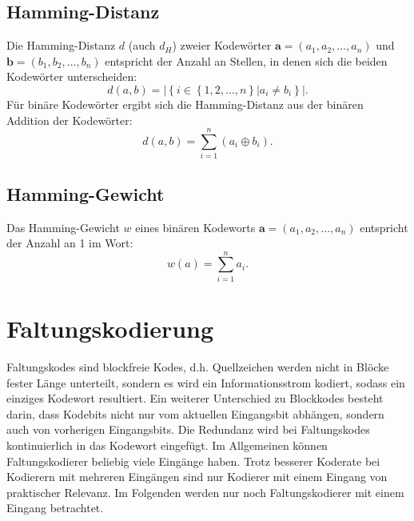 \subsection{Hamming-Distanz}
\label{kapitel:grundlagen_hamming_distanz}
Die Hamming-Distanz $d$ (auch $d_{H}$) zweier Kodewörter $\mathbf{a}=\left( a_{1},a_{2},\dots ,a_{n}\right)$ und $\mathbf{b}=\left( b_{1},b_{2},\dots ,b_{n}\right)$ entspricht der Anzahl an Stellen, in denen sich die beiden Kodewörter unterscheiden:
\begin{equation}
d(a,b)=\vert\left\lbrace i \in \left\lbrace 1,2,\dots ,n \right\rbrace\vert a_{i}\neq b_{i}\right\rbrace\vert.
\end{equation}
Für binäre Kodewörter ergibt sich die Hamming-Distanz aus der binären Addition der Kodewörter:
\begin{equation}
d(a,b)=\sum_{i=1}^{n} \left( a_{i} \oplus b_{i}\right).
\end{equation}

\subsection{Hamming-Gewicht}
\label{kapitel:grundlagen_hamming_gewicht}
Das Hamming-Gewicht $w$ eines binären Kodeworts $\mathbf{a}=\left( a_{1},a_{2},\dots ,a_{n}\right)$ entspricht der Anzahl an 1 im Wort:
\begin{equation}
w(a)=\sum_{i=1}^{n} a_{i}.
\end{equation}

\section{Faltungskodierung}
\label{kapitel:grundlagen_faltungskodierung}
Faltungskodes sind blockfreie Kodes, d.h. Quellzeichen werden nicht in Blöcke fester Länge unterteilt, sondern es wird ein Informationsstrom kodiert, sodass ein einziges Kodewort resultiert. Ein weiterer Unterschied zu Blockkodes besteht darin, dass Kodebits nicht nur vom aktuellen Eingangsbit abhängen, sondern auch von vorherigen Eingangsbits. Die Redundanz wird bei Faltungskodes kontinuierlich in das Kodewort eingefügt. Im Allgemeinen können Faltungskodierer beliebig viele Eingänge haben. Trotz besserer Koderate bei Kodierern mit mehreren Eingängen sind nur Kodierer mit einem Eingang von praktischer Relevanz. Im Folgenden werden nur noch Faltungskodierer mit einem Eingang betrachtet.

